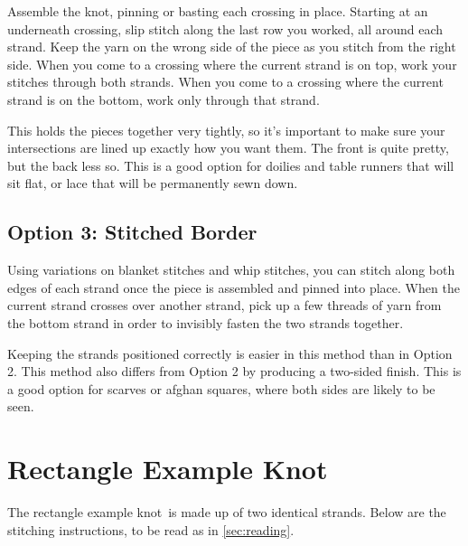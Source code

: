 \documentclass[openany]{book}
\newcommand{\rk}{rectangle example knot}
\newcommand{\RK}{Rectangle Example Knot}
\begin{document}
Assemble the knot, pinning or basting each crossing in place. Starting at an underneath crossing, slip stitch along the last row you worked, all around each strand.  Keep the yarn on the wrong side of the piece as you stitch from the right side. When you come to a crossing where the current strand is on top, work your stitches through both strands. When you come to a crossing where the current strand is on the bottom, work only through that strand.

This holds the pieces together very tightly, so it's important to make sure your intersections are lined up exactly how you want them. The front is quite pretty, but the back less so. This is a good option for  doilies and table runners that will sit flat, or lace that will be permanently sewn down.

\subsection*{Option 3: Stitched Border}
Using variations on blanket stitches and whip stitches, you can stitch along both edges of each strand once the piece is assembled and pinned into place. When the current strand crosses over another strand, pick up a few threads of yarn from the bottom strand in order to invisibly fasten the two strands together.

Keeping the strands positioned correctly is easier in this method than in Option 2. This method also differs from Option 2 by producing a two-sided finish. This is a good option for scarves or afghan squares, where both sides are likely to be seen.



\section{\RK}
The \rk~is made up of two identical strands. Below are the stitching instructions, to be read as in \ref{sec:reading}. 
\end{document}
